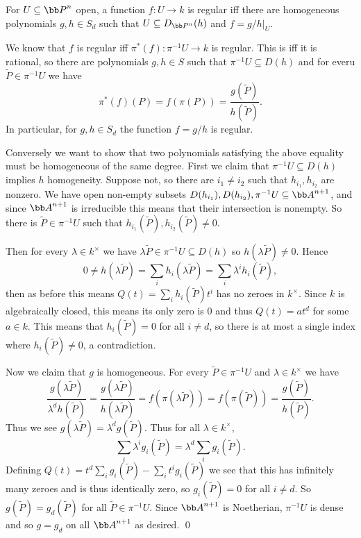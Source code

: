     For $U\subseteq\bP^n$ open, a function $f\colon U\to k$ is regular iff there are homogeneous polynomials $g,h\in S_d$ such that $U\subseteq D_{\bP^n}(h)$ and $f=g/h|_U$.

\elemm

\bproof

    We know that $f$ is regular iff $\pi^*(f)\colon\pi^{-1}U\to k$ is regular.
    This is iff it is rational, so there are polynomials $g,h\in S$ such that $\pi^{-1}U\subseteq D(h)$ and for everu $\tilde P\in\pi^{-1}U$ we have
    $$ \pi^*(f)(P) = f(\pi(P)) = \frac{g(\tilde P)}{h(\tilde P)} . $$
    In particular, for $g,h\in S_d$ the function $f=g/h$ is regular.

    Conversely we want to show that two polynomials satisfying the above equality must be homogeneous of the same degree.
    First we claim that $\pi^{-1}U\subseteq D(h)$ implies $h$ homogeneity.
    Suppose not, so there are $i_1\neq i_2$ such that $h_{i_1},h_{i_2}$ are nonzero.
    We have open non-empty subsets $D(h_{i_1}),D(h_{i_2}),\pi^{-1}U\subseteq\bA^{n+1}$, and since $\bA^{n+1}$ is irreducible this means that their intersection is nonempty.
    So there is $\tilde P\in\pi^{-1}U$ such that $h_{i_1}(\tilde P),h_{i_2}(\tilde P)\neq0$.

    Then for every $\lambda\in k^\times$ we have $\lambda\tilde P\in\pi^{-1}U\subseteq D(h)$ so $h(\lambda\tilde P)\neq0$.
    Hence
    $$ 0\neq h(\lambda\tilde P) = \sum_ih_i(\lambda\tilde P) = \sum_i\lambda^ih_i(\tilde P) , $$
    then as before this means $Q(t)=\sum_ih_i(\tilde P)t^i$ has no zeroes in $k^\times$.
    Since $k$ is algebraically closed, this means its only zero is $0$ and thus $Q(t)=at^d$ for some $a\in k$.
    This means that $h_i(\tilde P)=0$ for all $i\neq d$, so there is at most a single index where $h_i(\tilde P)\neq0$, a contradiction.

    Now we claim that $g$ is homogeneous.
    For every $\tilde P\in\pi^{-1}U$ and $\lambda\in k^\times$ we have
    $$ \frac{g(\lambda\tilde P)}{\lambda^dh(\tilde P)} = \frac{g(\lambda\tilde P)}{h(\lambda\tilde P)} = f(\pi(\lambda\tilde P)) = f(\pi(\tilde P)) = \frac{g(\tilde P)}{h(\tilde P)} . $$
    Thus we see $g(\lambda\tilde P)=\lambda^dg(\tilde P)$.
    Thus for all $\lambda\in k^\times$,
    $$ \sum_i\lambda^ig_i(\tilde P) = \lambda^d\sum_ig_i(\tilde P) . $$
    Defining $Q(t)=t^d\sum_ig_i(\tilde P)-\sum_it^ig_i(\tilde P)$ we see that this has infinitely many zeroes and is thus identically zero, so $g_i(\tilde P)=0$ for all $i\neq d$.
    So $g(\tilde P)=g_d(\tilde P)$ for all $\tilde P\in\pi^{-1}U$.
    Since $\bA^{n+1}$ is Noetherian, $\pi^{-1}U$ is dense and so $g=g_d$ on all $\bA^{n+1}$ as desired.
    \qed

